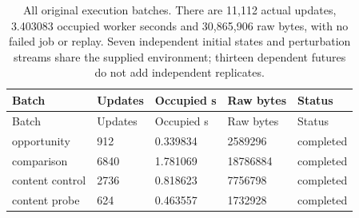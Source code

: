 \begin{longtable}{lllll}
\caption{All original execution batches. There are 11,112 actual updates, 3.403083 occupied worker seconds and 30,865,906 raw bytes, with no failed job or replay. Seven independent initial states and perturbation streams share the supplied environment; thirteen dependent futures do not add independent replicates.}\label{tab:contact-jobs}\\
\toprule
Batch & Updates & Occupied s & Raw bytes & Status\\
\midrule\endfirsthead
\toprule
Batch & Updates & Occupied s & Raw bytes & Status\\
\midrule\endhead
opportunity & 912 & 0.339834 & 2589296 & completed\\
comparison & 6840 & 1.781069 & 18786884 & completed\\
content control & 2736 & 0.818623 & 7756798 & completed\\
content probe & 624 & 0.463557 & 1732928 & completed\\
\bottomrule
\end{longtable}
\endgroup
